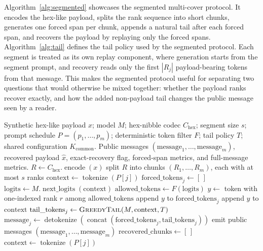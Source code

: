 \documentclass[fleqn,10pt]{wlscirep}
\newcommand{\Encode}{\operatorname{encode}}
\newcommand{\Tokenize}{\operatorname{tokenize}}
\newcommand{\Detokenize}{\operatorname{detokenize}}
\newcommand{\NextLogits}{\operatorname{next\_logits}}
\begin{document}
Algorithm~\ref{alg:segmented} showcases the segmented multi-cover protocol. It encodes the hex-like payload, splits the rank sequence into short chunks, generates one forced span per chunk, appends a natural tail after each forced span, and recovers the payload by replaying only the forced spans. Algorithm~\ref{alg:tail} defines the tail policy used by the segmented protocol.
Each segment is treated as its own replay component, where generation starts from the segment prompt, and recovery reads only the first \(|R_j|\) payload-bearing tokens from that message. This makes the segmented protocol useful for separating two questions that would otherwise be mixed together: whether the payload ranks recover exactly, and how the added non-payload tail changes the public message seen by a reader.
\begin{algorithm}[H]
\caption{Segmented multi-cover RankCloak trial for distributing a hex-nibble payload across payload-bearing forced spans with non-payload natural tails.}
\label{alg:segmented}
\begin{algorithmic}[1]
\Require Synthetic hex-like payload \(x\); model \(M\); hex-nibble codec \(C_{\mathrm{hex}}\); segment size \(s\); prompt schedule \(P=(p_1,\ldots,p_m)\); deterministic token filter \(F\); tail policy \(T\); shared configuration \(K_{\mathrm{common}}\).
\Ensure Public messages \((\mathrm{message}_1,\ldots,\mathrm{message}_m)\), recovered payload \(\hat{x}\), exact-recovery flag, forced-span metrics, and full-message metrics.
\State \(R \gets C_{\mathrm{hex}}.\Encode(x)\)
\State split \(R\) into chunks \((R_1,\ldots,R_m)\), each with at most \(s\) ranks
    \State \(\mathrm{context} \gets \Tokenize(P[j])\)
    \State \(\mathrm{forced\_tokens}_j \gets [\,]\)
        \State \(\mathrm{logits} \gets M.\NextLogits(\mathrm{context})\)
        \State \(\mathrm{allowed\_tokens} \gets F(\mathrm{logits})\)
        \State \(y \gets\) token with one-indexed rank \(r\) among \(\mathrm{allowed\_tokens}\)
        \State append \(y\) to \(\mathrm{forced\_tokens}_j\)
        \State append \(y\) to \(\mathrm{context}\)
    \EndFor
    \State \(\mathrm{tail\_tokens}_j \gets \Call{GreedyTail}{M,\mathrm{context},T}\)
    \State \(\mathrm{message}_j \gets \Detokenize(\operatorname{concat}(\mathrm{forced\_tokens}_j,\mathrm{tail\_tokens}_j))\)
\EndFor
\State emit public messages \((\mathrm{message}_1,\ldots,\mathrm{message}_m)\)
\Statex
\State \(\mathrm{recovered\_chunks} \gets [\,]\)
    \State \(\mathrm{context} \gets \Tokenize(P[j])\)

\end{algorithmic}
\end{algorithm}
\end{document}
